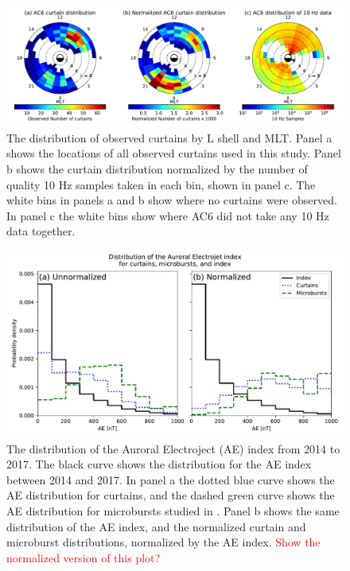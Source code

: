 \documentclass[draft]{agujournal2019}
\begin{document}
\begin{figure}
\includegraphics[width=\textwidth]{fig2_3.pdf}
\caption{The distribution of observed curtains by L shell and MLT. Panel a shows the locations of all observed curtains used in this study. Panel b shows the curtain distribution normalized by the number of quality 10 Hz samples taken in each bin, shown in panel c. The white bins in panels a and b show where no curtains were observed. In panel c the white bins show where AC6 did not take any 10 Hz data together.}
\label{l_mlt_dist}
\end{figure}

\begin{figure}
\includegraphics[width=\textwidth]{ac6_curtain_microburst_AE_dist.pdf}
\caption{The distribution of the Auroral Electroject (AE) index from 2014 to 2017. The black curve shows the distribution for the AE index between 2014 and 2017. In panel a the dotted blue curve shows the AE distribution for curtains, and the dashed green curve shows the AE distribution for microbursts studied in . Panel b shows the same distribution of the AE index, and the normalized curtain and microburst distributions, normalized by the AE index. \textcolor{red}{Show the normalized version of this plot?}}
\label{ae_dist}
\end{figure}
\end{document}

